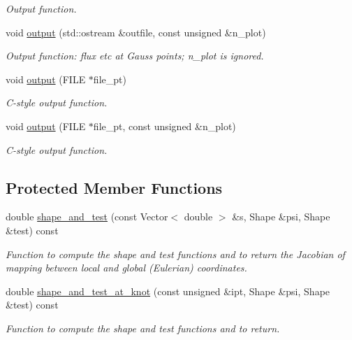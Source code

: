 \begin{DoxyCompactItemize}
\begin{DoxyCompactList}\small\item\em Output function. \end{DoxyCompactList}\item 
void \hyperlink{classoomph_1_1HelmholtzFluxFromNormalDisplacementBCElement_aec87ba2999b0c2e58447ca490b987c0e}{output} (std\+::ostream \&outfile, const unsigned \&n\+\_\+plot)
\begin{DoxyCompactList}\small\item\em Output function\+: flux etc at Gauss points; n\+\_\+plot is ignored. \end{DoxyCompactList}\item 
void \hyperlink{classoomph_1_1HelmholtzFluxFromNormalDisplacementBCElement_ae75706159d926cbad94fe66fa607b1fe}{output} (F\+I\+LE $\ast$file\+\_\+pt)
\begin{DoxyCompactList}\small\item\em C-\/style output function. \end{DoxyCompactList}\item 
void \hyperlink{classoomph_1_1HelmholtzFluxFromNormalDisplacementBCElement_a3a08931249b5071b11ec8082848cc94e}{output} (F\+I\+LE $\ast$file\+\_\+pt, const unsigned \&n\+\_\+plot)
\begin{DoxyCompactList}\small\item\em C-\/style output function. \end{DoxyCompactList}\end{DoxyCompactItemize}
\subsection*{Protected Member Functions}
\begin{DoxyCompactItemize}
\item 
double \hyperlink{classoomph_1_1HelmholtzFluxFromNormalDisplacementBCElement_a91ee0e36a8c127d83269a08d6740dfb2}{shape\+\_\+and\+\_\+test} (const Vector$<$ double $>$ \&s, Shape \&psi, Shape \&test) const
\begin{DoxyCompactList}\small\item\em Function to compute the shape and test functions and to return the Jacobian of mapping between local and global (Eulerian) coordinates. \end{DoxyCompactList}\item 
double \hyperlink{classoomph_1_1HelmholtzFluxFromNormalDisplacementBCElement_ad3a879cf569b317c086f07872164f9f8}{shape\+\_\+and\+\_\+test\+\_\+at\+\_\+knot} (const unsigned \&ipt, Shape \&psi, Shape \&test) const
\begin{DoxyCompactList}\small\item\em Function to compute the shape and test functions and to return. \end{DoxyCompactList}\end{DoxyCompactItemize}

